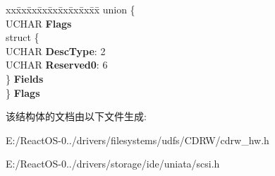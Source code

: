 \begin{DoxyCompactItemize}
\begin{tabbing}
\end{tabbing}\item 
\mbox{\label{struct___f_o_r_m_a_t_t_a_b_l_e___c_a_p_a_c_i_t_y___d_e_s_c_r_i_p_t_o_r_a91aeaa57e37878eb8174501a7f52524b}} 
\begin{tabbing}
xx\=xx\=xx\=xx\=xx\=xx\=xx\=xx\=xx\=\kill
union \{\\
\>UCHAR {\bfseries Flags}\\
\>struct \{\\
\>\>UCHAR {\bfseries DescType}: 2\\
\>\>UCHAR {\bfseries Reserved0}: 6\\
\>\} {\bfseries Fields}\\
\} {\bfseries Flags}\\

\end{tabbing}\end{DoxyCompactItemize}


该结构体的文档由以下文件生成\+:\begin{DoxyCompactItemize}
\item 
E\+:/\+React\+O\+S-\/0../drivers/filesystems/udfs/\+C\+D\+R\+W/cdrw\+\_\+hw.\+h\item 
E\+:/\+React\+O\+S-\/0../drivers/storage/ide/uniata/scsi.\+h\end{DoxyCompactItemize}
